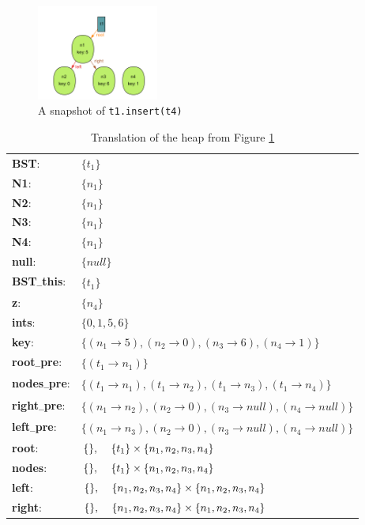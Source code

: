 \documentclass[11pt,twoside,a4paper]{book}
\begin{document}
\begin{figure}[ht]
\begin{center}
\includegraphics[width=4cm]{figures/bst}
\caption{A snapshot of \texttt{t1.insert(t4)}}
\label{fig:bstInsert}
\end{center}
\end{figure}

\newpage


\begin{table}[ht]
\begin{center}
\begin{tabular}{ l l }
	\textbf{BST}: & $\{t_1\}$\\
	\textbf{N1}: & $\{n_1\}$\\
	\textbf{N2}: & $\{n_1\}$\\
	\textbf{N3}: & $\{n_1\}$\\
	\textbf{N4}: & $\{n_1\}$\\
	\textbf{null}: & $\{null\}$\\
	\textbf{BST\textsubscript{--}this}: & $\{t_1\}$\\
	\textbf{z}: & $\{n_4\}$\\
	\textbf{ints}: & $\{0, 1, 5, 6\}$\\
  \hline
  	\textbf{key}: & $\{(n_1\rightarrow 5),(n_2\rightarrow
	0),(n_3\rightarrow 6),(n_4\rightarrow 1)\}$\\
	\textbf{root\textsubscript{--}pre}: & $\{(t_1\rightarrow n_1)\}$\\
	\textbf{nodes\textsubscript{--}pre}: & $\{(t_1\rightarrow n_1),(t_1\rightarrow
	n_2),(t_1\rightarrow n_3),(t_1\rightarrow n_4)\}$\\
	\textbf{right\textsubscript{--}pre}: & $\{(n_1\rightarrow n_2),(n_2\rightarrow
	0),(n_3\rightarrow null),(n_4\rightarrow null)\}$\\
	\textbf{left\textsubscript{--}pre}: & $\{(n_1\rightarrow n_3),(n_2\rightarrow
	0),(n_3\rightarrow null),(n_4\rightarrow null)\}$\\
	\hline
	\textbf{root}: & $\{\},\hspace{4mm}\{t_1\}\times\{n_1,n_2,n_3,n_4\}$\\
	\textbf{nodes}: & $\{\},\hspace{4mm}\{t_1\}\times\{n_1,n_2,n_3,n_4\}$\\
	\textbf{left}: &
	$\{\},\hspace{4mm}\{n_1,n_2,n_3,n_4\}\times\{n_1,n_2,n_3,n_4\}$\\
	\textbf{right}: &
	$\{\},\hspace{4mm}\{n_1,n_2,n_3,n_4\}\times\{n_1,n_2,n_3,n_4\}$\\
	
\end{tabular}
\end{center}
\caption{Translation of the heap from Figure \ref{fig:bstInsert}}
\label{fig:translationTable}
\end{table}
\end{document}
